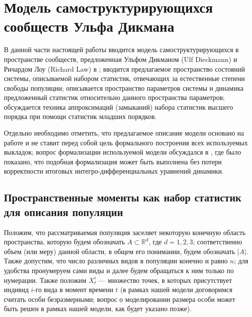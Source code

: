 \chapter{Модель самоструктурирующихся сообществ Ульфа Дикмана}

В данной части настоящей работы вводится модель самоструктурирующихся в пространстве сообществ, предложенная Ульфом Дикманом (Ulf Dieckmann)  и Ричардом Лоу (Richard Law) в \cite{law_dieckmann_2000,law_2003}; вводится предлагаемое пространство состояний системы, описываемой набором статистик, отвечающих за естественные степени свободы популяции; описывается пространство параметров системы и динамика предложенный статистик относительно данного пространства параметров; обсуждается техника аппроксимаций (замыканий) набора статистик высшего порядка при помощи статистик младших порядков.

Отдельно необходимо отметить, что предлагаемое описание модели основано на работе \cite{law_dieckmann_2000} и не ставит перед собой цель формального построения всех используемых выкладок; вопрос формализации используемой модели обсуждался в \cite{egor}, где было показано, что подобная формализация может быть выполнена без потери корректности итоговых интегро-дифференциальных уравнений динамики.

\section{Пространственные моменты как набор статистик для описания популяции}

Положим, что рассматриваемая популяция заселяет некоторую конечную область пространства, которую будем обозначать $A \subset \mathbb{R}^d$, где $d = 1, 2, 3$; соответственно объем (или меру)  данной области, в общем его понимании, будем обозначать $|A|$. Также допустим, что число различных видов в популяции конечно и равно $n$; для удобства пронумеруем сами виды и далее будем обращаться к ним только по нумерации. Также положим $X^i_t$ --- множество точек, в которых присутствует индивид $i$-го вида в момент времени $t$ (в рамках нашей модели договоримся считать особи безразмерными; вопрос о моделировании размера особи может быть решен в рамках нашей модели, как будет указано позже).

